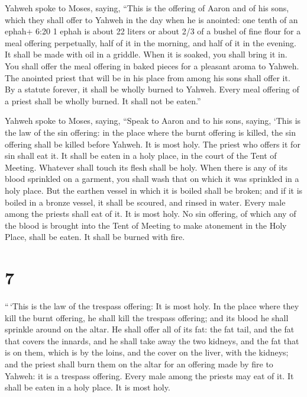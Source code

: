  Yahweh spoke to Moses, saying,  ``This is the
offering of Aaron and of his sons, which they shall offer to Yahweh in
the day when he is anointed: one tenth of an ephah+ 6:20 1 ephah is
about 22 liters or about 2/3 of a bushel of fine flour for a meal
offering perpetually, half of it in the morning, and half of it in the
evening.  It shall be made with oil in a griddle. When it
is soaked, you shall bring it in. You shall offer the meal offering in
baked pieces for a pleasant aroma to Yahweh.  The anointed
priest that will be in his place from among his sons shall offer it. By
a statute forever, it shall be wholly burned to Yahweh. 
Every meal offering of a priest shall be wholly burned. It shall not be
eaten.''

 Yahweh spoke to Moses, saying,  ``Speak to
Aaron and to his sons, saying, `This is the law of the sin offering: in
the place where the burnt offering is killed, the sin offering shall be
killed before Yahweh. It is most holy.  The priest who
offers it for sin shall eat it. It shall be eaten in a holy place, in
the court of the Tent of Meeting.  Whatever shall touch its
flesh shall be holy. When there is any of its blood sprinkled on a
garment, you shall wash that on which it was sprinkled in a holy place.
 But the earthen vessel in which it is boiled shall be
broken; and if it is boiled in a bronze vessel, it shall be scoured, and
rinsed in water.  Every male among the priests shall eat of
it. It is most holy.  No sin offering, of which any of the
blood is brought into the Tent of Meeting to make atonement in the Holy
Place, shall be eaten. It shall be burned with fire.

\hypertarget{section-6}{%
\section{7}\label{section-6}}

 ``\,`This is the law of the trespass offering: It is most
holy.  In the place where they kill the burnt offering, he
shall kill the trespass offering; and its blood he shall sprinkle around
on the altar.  He shall offer all of its fat: the fat tail,
and the fat that covers the innards,  and he shall take away
the two kidneys, and the fat that is on them, which is by the loins, and
the cover on the liver, with the kidneys;  and the priest
shall burn them on the altar for an offering made by fire to Yahweh: it
is a trespass offering.  Every male among the priests may
eat of it. It shall be eaten in a holy place. It is most holy.

